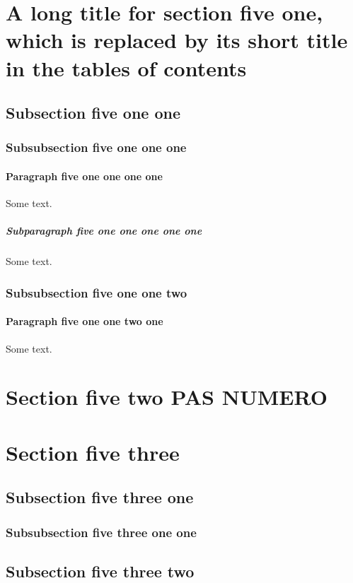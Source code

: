 \documentclass{book}
\begin{document}
\section[Short title five one]{A long title for section five one, which
  is replaced by its short title in the tables of contents}
\subsection{Subsection five one one}
\localtableofcontents
\subsubsection{Subsubsection five one one one}
\paragraph{Paragraph five one one one one}
Some text.
\subparagraph{Subparagraph five one one one one one}
Some text.
\subsubsection{Subsubsection five one one two}
\paragraph{Paragraph five one one two one}
Some text.

\section*{Section five two PAS NUMERO}

\section{Section five three}
\invisiblelocaltableofcontents\label{toc:invisible}
\subsection{Subsection five three one}
\subsubsection{Subsubsection five three one one}
\subsection{Subsection five three two}
\end{document}
